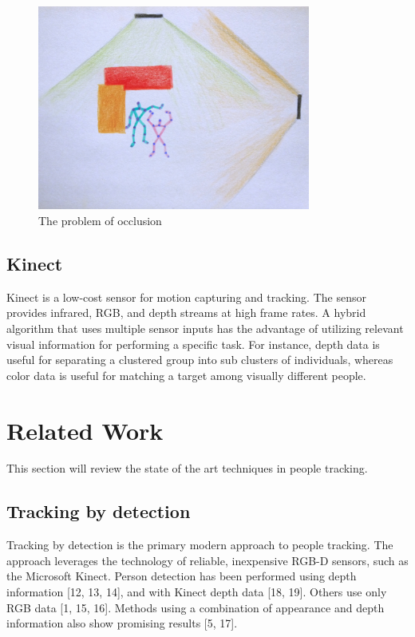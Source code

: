 \documentclass[paper=a4, fontsize=11pt]{scrartcl}
\numberwithin{equation}{section}		%
\numberwithin{figure}{section}			%
\numberwithin{table}{section}				%
\begin{document}
\begin{figure}
	\centering
    \includegraphics[width=0.8\textwidth]{occlusion}
    \caption{The problem of occlusion}
    \label{fig:occlusion_problem}
\end{figure}

\subsection{Kinect}

Kinect is a low-cost sensor for motion capturing and tracking. The sensor provides infrared, RGB, and depth streams at high frame rates. A hybrid algorithm that uses multiple sensor inputs has the advantage of utilizing relevant visual information for performing a specific task. For instance, depth data is useful for separating a clustered group into sub clusters of individuals, whereas color data is useful for matching a target among visually different people.

\section{Related Work}

This section will review the state of the art techniques in people tracking.

\subsection{Tracking by detection}

Tracking by detection is the primary modern approach to people tracking. The approach leverages the technology of reliable, inexpensive RGB-D sensors, such as the Microsoft Kinect. Person detection has been performed using depth information [12, 13, 14], and with Kinect depth data [18, 19]. Others use only RGB data [1, 15, 16]. Methods using a combination of appearance and depth information also show promising results [5, 17]. 
\end{document}
